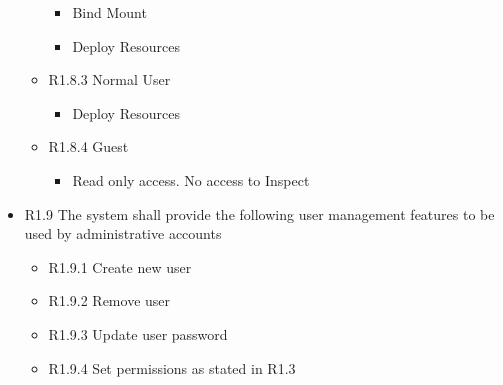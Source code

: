 \documentclass[]{article}
\begin{document}
\begin{itemize}
\begin{itemize}
		            \begin{itemize}
			            \item Bind Mount
			            \item Deploy Resources
		            \end{itemize}
		      \item R1.8.3 Normal User
		            \begin{itemize}
			            \item Deploy Resources
		            \end{itemize}
		      \item R1.8.4 Guest
		            \begin{itemize}
			            \item Read only access. No access to Inspect
		            \end{itemize}
	      \end{itemize}
	\item R1.9 The system shall provide the following user management features to be used by administrative accounts
	      \begin{itemize}
		      \item R1.9.1 Create new user
		      \item R1.9.2 Remove user
		      \item R1.9.3 Update user password
		      \item R1.9.4 Set permissions as stated in R1.3
	      \end{itemize}
\end{itemize}
\end{document}
